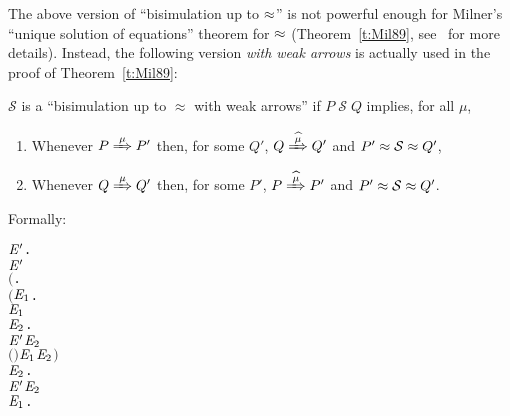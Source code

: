 The above version of ``bisimulation up to $\approx$'' 
is not powerful enough for Milner's ``unique solution of equations''
theorem for $\approx$ (Theorem~\ref{t:Mil89}, see~\cite{sangiorgi1992problem} for more details).
Instead, the following version \emph{with weak arrows} is
actually used in the proof of Theorem~\ref{t:Mil89}:
\begin{definition}%
  \label{def:doubleweak}
$\mathcal{S}$ is a ``bisimulation up to $\approx$ with weak arrows'' if $P \;
  \mathcal{S} \; Q$ implies, for all $\mu$,
\begin{enumerate}
\item Whenever $P \Arr{\mu} P'$ then, for some $Q'$, $Q \Arcap{\mu} Q'$ and $P' \approx {\cal S} \approx Q'$,
\item Whenever $Q \Arr{\mu} Q'$ then, for some $P'$, $P \Arcap{\mu} P'$ and $P' \approx {\cal S} \approx Q'$.
\end{enumerate}
Formally:
\begin{alltt}
     \HOLTokenDefEquality{}
     \HOLSymConst{\HOLTokenForall{}} \ensuremath{\HOLBoundVar{E}\sp{\prime}}.
           \ensuremath{\HOLBoundVar{E}\sp{\prime}} \HOLSymConst{\HOLTokenImp{}}
         \ensuremath{(}\HOLSymConst{\HOLTokenForall{}}.
              \ensuremath{(}\HOLSymConst{\HOLTokenForall{}}\ensuremath{\HOLBoundVar{E}\sb{\mathrm{1}}}.
                    \HOLTokenWeakTransBegin{} \HOLTokenWeakTransEnd \ensuremath{\HOLBoundVar{E}\sb{\mathrm{1}}} \HOLSymConst{\HOLTokenImp{}}
                   \HOLSymConst{\HOLTokenExists{}}\ensuremath{\HOLBoundVar{E}\sb{\mathrm{2}}}.
                       \ensuremath{\HOLBoundVar{E}\sp{\prime}} \HOLTokenWeakTransBegin{} \HOLTokenWeakTransEnd \ensuremath{\HOLBoundVar{E}\sb{\mathrm{2}}} \HOLSymConst{\HOLTokenConj{}}
                       \ensuremath{(} \HOLSymConst{\HOLTokenRCompose{}}  \HOLSymConst{\HOLTokenRCompose{}} \ensuremath{)} \ensuremath{\HOLBoundVar{E}\sb{\mathrm{1}}} \ensuremath{\HOLBoundVar{E}\sb{\mathrm{2}}}\ensuremath{)} \HOLSymConst{\HOLTokenConj{}}
              \HOLSymConst{\HOLTokenForall{}}\ensuremath{\HOLBoundVar{E}\sb{\mathrm{2}}}.
                  \ensuremath{\HOLBoundVar{E}\sp{\prime}} \HOLTokenWeakTransBegin{} \HOLTokenWeakTransEnd \ensuremath{\HOLBoundVar{E}\sb{\mathrm{2}}} \HOLSymConst{\HOLTokenImp{}}
                  \HOLSymConst{\HOLTokenExists{}}\ensuremath{\HOLBoundVar{E}\sb{\mathrm{1}}}.

\end{alltt}
\end{definition}
